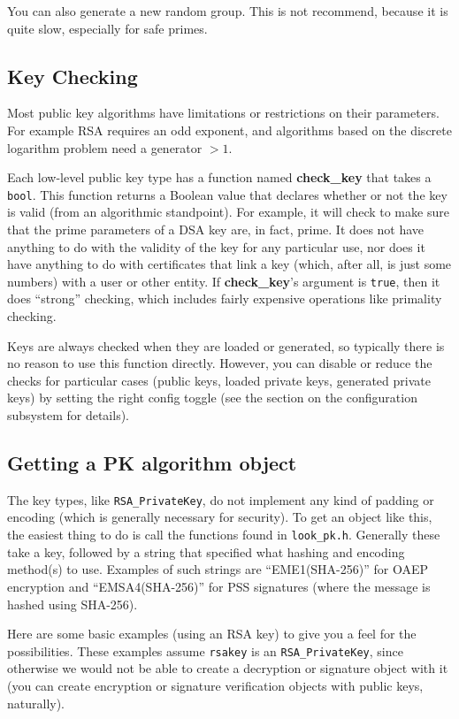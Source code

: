 \documentclass{article}
\newcommand{\filename}[1]{\texttt{#1}}
\newcommand{\function}[1]{\textbf{#1}}
\newcommand{\type}[1]{\texttt{#1}}
\begin{document}
You can also generate a new random group. This is not recommend, because it is
quite slow, especially for safe primes.

\subsection{Key Checking}

Most public key algorithms have limitations or restrictions on their
parameters. For example RSA requires an odd exponent, and algorithms based on
the discrete logarithm problem need a generator $> 1$.

Each low-level public key type has a function named \function{check\_key} that
takes a \type{bool}. This function returns a Boolean value that declares
whether or not the key is valid (from an algorithmic standpoint). For example,
it will check to make sure that the prime parameters of a DSA key are, in fact,
prime. It does not have anything to do with the validity of the key for any
particular use, nor does it have anything to do with certificates that link a
key (which, after all, is just some numbers) with a user or other entity. If
\function{check\_key}'s argument is \type{true}, then it does ``strong''
checking, which includes fairly expensive operations like primality checking.

Keys are always checked when they are loaded or generated, so typically there
is no reason to use this function directly. However, you can disable or reduce
the checks for particular cases (public keys, loaded private keys, generated
private keys) by setting the right config toggle (see the section on the
configuration subsystem for details).

\subsection{Getting a PK algorithm object}

The key types, like \type{RSA\_PrivateKey}, do not implement any kind
of padding or encoding (which is generally necessary for security). To
get an object like this, the easiest thing to do is call the functions
found in \filename{look\_pk.h}. Generally these take a key, followed
by a string that specified what hashing and encoding method(s) to
use. Examples of such strings are ``EME1(SHA-256)'' for OAEP
encryption and ``EMSA4(SHA-256)'' for PSS signatures (where the
message is hashed using SHA-256).

Here are some basic examples (using an RSA key) to give you a feel for
the possibilities. These examples assume \type{rsakey} is an
\type{RSA\_PrivateKey}, since otherwise we would not be able to create
a decryption or signature object with it (you can create encryption or
signature verification objects with public keys, naturally).
\end{document}
